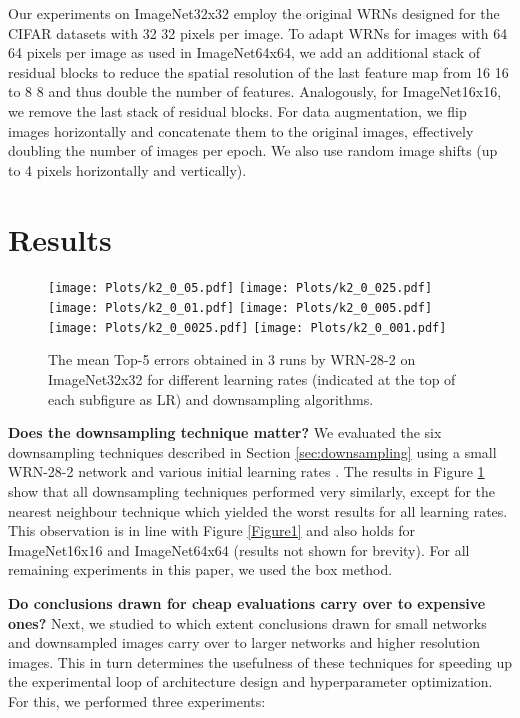 \documentclass{article} \usepackage{iclr2017_conference,times}
\begin{document}
Our experiments on ImageNet32x32 employ the original WRNs designed for the CIFAR datasets with 32  32 pixels per image. To adapt WRNs for images with 64  64 pixels per image as used in ImageNet64x64, we add an additional stack of residual blocks to reduce the spatial resolution of the last feature map from 16  16 to 8  8 and thus double the number of features. Analogously, for ImageNet16x16, we remove the last stack of residual blocks. For data augmentation, we  flip images horizontally and concatenate them to the original images, effectively doubling the number of images per epoch. We also use random image shifts (up to 4 pixels horizontally and vertically).


\section{Results}


\begin{figure}[tbp]
\begin{center}
\texttt{[image: Plots/k2\_0\_05.pdf]}
\texttt{[image: Plots/k2\_0\_025.pdf]}
\texttt{[image: Plots/k2\_0\_01.pdf]}
\texttt{[image: Plots/k2\_0\_005.pdf]}
\texttt{[image: Plots/k2\_0\_0025.pdf]}
\texttt{[image: Plots/k2\_0\_001.pdf]}
\end{center}
\caption{The mean Top-5 errors obtained in 3 runs by WRN-28-2 on ImageNet32x32 for different learning rates (indicated at the top of each subfigure as LR) and downsampling algorithms.}
\label{Figure2}
\end{figure}

\textbf{Does the downsampling technique matter?} 
We evaluated the six downsampling techniques described in Section \ref{sec:downsampling} using a small WRN-28-2 network and various initial learning rates . The results in Figure \ref{Figure2} show that all downsampling techniques performed very similarly, except for the nearest neighbour technique which yielded the worst results for all learning rates. This observation is in line with Figure \ref{Figure1} and also holds for ImageNet16x16 and ImageNet64x64 (results not shown for brevity). For all remaining experiments in this paper, we used the box method.

\textbf{Do conclusions drawn for cheap evaluations carry over to expensive ones?} 
Next, we studied to which extent conclusions drawn for small networks and downsampled images carry over to larger networks and higher resolution images. This in turn determines the usefulness of these techniques for speeding up the experimental loop of architecture design and hyperparameter optimization. For this, we performed three experiments:
\end{document}
